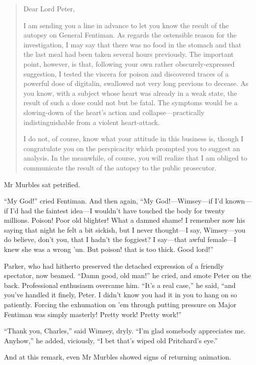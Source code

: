 \begin{quotation}
\noindent Dear Lord Peter,

\indent I am sending you a line in advance to let you know the result of the autopsy on General Fentiman. As regards the ostensible reason for the investigation, I may say that there was no food in the stomach and that the last meal had been taken several hours previously. The important point, however, is that, following your own rather obscurely-expressed suggestion, I tested the viscera for poison and discovered traces of a powerful dose of digitalin, swallowed not very long previous to decease. As you know, with a subject whose heart was already in a weak state, the result of such a dose could not but be fatal. The symptoms would be a slowing-down of the heart's action and collapse\allowbreak---\allowbreak practically indistinguishable from a violent heart-attack.

I do not, of course, know what your attitude in this business is, though I congratulate you on the perspicacity which prompted you to suggest an analysis. In the meanwhile, of course, you will realize that I am obliged to communicate the result of the autopsy to the public prosecutor.
\end{quotation}

Mr Murbles sat petrified.

\enquote{My God!} cried Fentiman. And then again, \enquote{My God!---Wimsey\allowbreak---\allowbreak if I'd known\allowbreak---\allowbreak if I'd had the faintest idea\allowbreak---\allowbreak I wouldn't have touched the body for twenty millions. Poison! Poor old blighter! What a damned shame! I remember now his saying that night he felt a bit sickish, but I never thought\allowbreak---\allowbreak I say, Wimsey\allowbreak---\allowbreak you do believe, don't you, that I hadn't the foggiest? I say\allowbreak---\allowbreak that awful female\allowbreak---\allowbreak I knew she was a wrong 'un. But poison! that is too thick. Good lord!}

Parker, who had hitherto preserved the detached expression of a friendly spectator, now beamed. \enquote{Damn good, old man!} he cried, and smote Peter on the back. Professional enthusiasm overcame him. \enquote{It's a real case,} he said, \enquote{and you've handled it finely, Peter. I didn't know you had it in you to hang on so patiently. Forcing the exhumation on 'em through putting pressure on Major Fentiman was simply masterly! Pretty work! Pretty work!}

\enquote{Thank you, Charles,} said Wimsey, dryly. \enquote{I'm glad somebody appreciates me. Anyhow,} he added, viciously, \enquote{I bet that's wiped old Pritchard's eye.}

And at this remark, even Mr Murbles showed signs of returning animation.